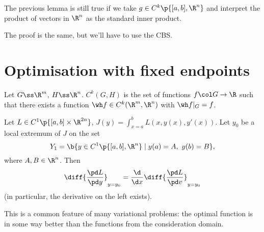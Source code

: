 \begin{lemma}
  \label{DR for inner product}
  The previous lemma is still true if we take $g \in C^k\p{[a, b], \R^n}$ and interpret the product of vectors in $\R^n$ as the standard inner product.
\end{lemma}

\begin{idea}
  The proof is the same, but we'll have to use the CBS.
\end{idea}

\section{Optimisation with fixed endpoints}

\begin{definition}[reminder]
  Let $G \ss \R^m$, $H \ss \R^n$. $C^k(G, H)$ is the set of functions $f \col G \to \R$ such that there exists a function $\wh f \in C^k(\R^m, \R^n)$ with $\wh f|_G = f$.
\end{definition}

\begin{theorem}
  Let $L \in C^1\p{[a, b]\times \R^{2n}}$, $J(y) = \int_{x=a}^b L(x, y(x), y'(x))$. Let $y_0$ be a local extremum of $J$ on the set
  $$ Y_1 = \b{y \in C^1\p{[a, b], \R^n} \mid y(a)=A,\ y(b)=B}, $$
  where $A, B \in \R^n$.
  Then
  \begin{equation}
    \label{Euler-Langrange}
    \diff{\frac{\pd L}{\pd y}}_{y=y_0} = \frac{\d}{\d x} \diff{\frac{\pd L}{\pd v}}_{y=y_0}
  \end{equation}
  (in particular, the derivative on the left exists).
\end{theorem}

This is a common feature of many variational problems: the optimal function is in some way better than the functions from the consideration domain.


